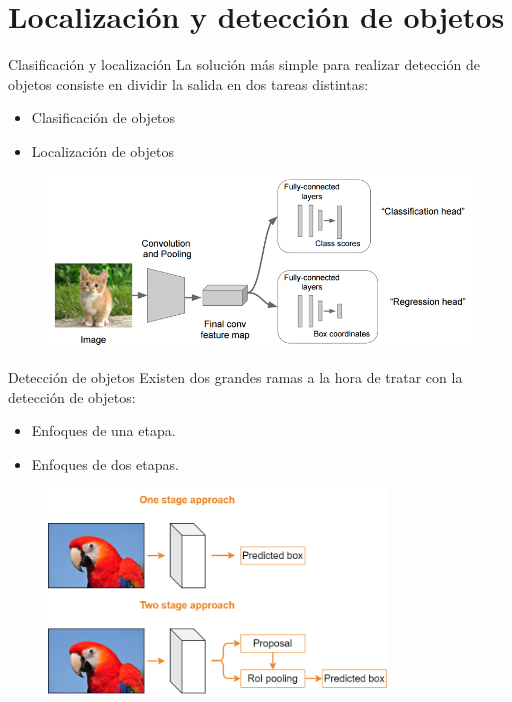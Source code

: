 \section{Localización y detección de objetos}

\begin{frame}{Clasificación y localización}
La \alert{solución más simple} para realizar detección de objetos consiste en dividir la salida en \alert{dos tareas distintas}:
\begin{itemize}
    \item Clasificación de objetos
    \item Localización de objetos
\end{itemize}

\begin{figure}
    \centering
    \includegraphics[width=\textwidth]{figures/Tema 4/ClasificationLocalization.png}
    \caption{\cite{ClaLocal}}
\end{figure}
\end{frame}

\begin{frame}{Detección de objetos}
Existen dos grandes ramas a la hora de tratar con la \alert{detección de objetos}:
\begin{itemize}
    \item \alert{Enfoques de una etapa}.
    \item \alert{Enfoques de dos etapas}.
\end{itemize}

\begin{figure}
    \centering
    \includegraphics[width=0.8\textwidth]{figures/Tema 4/StageApproaches.png}
\end{figure}
\end{frame}

